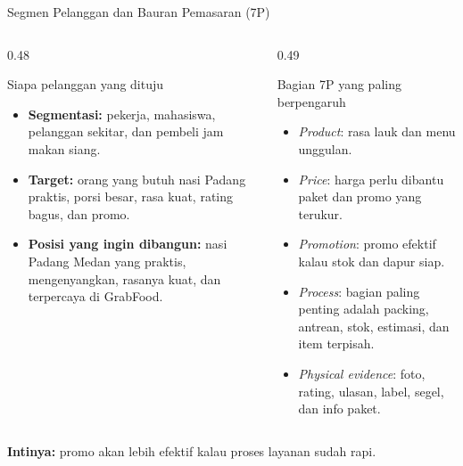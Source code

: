 \documentclass[aspectratio=169,11pt]{beamer}
\newcommand{\strong}[1]{\textbf{\textcolor{usuGreen!85!black}{#1}}}
\begin{document}
\begin{frame}{Segmen Pelanggan dan Bauran Pemasaran (7P)}
\small
\begin{columns}[T,onlytextwidth]
    \begin{column}{0.48\textwidth}
        \begin{block}{Siapa pelanggan yang dituju}
        \begin{itemize}
            \item \strong{Segmentasi:} pekerja, mahasiswa, pelanggan sekitar, dan pembeli jam makan siang.
            \item \strong{Target:} orang yang butuh nasi Padang praktis, porsi besar, rasa kuat, rating bagus, dan promo.
            \item \strong{Posisi yang ingin dibangun:} nasi Padang Medan yang praktis, mengenyangkan, rasanya kuat, dan terpercaya di GrabFood.
        \end{itemize}
        \end{block}
    \end{column}
    \begin{column}{0.49\textwidth}
        \begin{block}{Bagian 7P yang paling berpengaruh}
        \begin{itemize}
            \item \textit{Product}: rasa lauk dan menu unggulan.
            \item \textit{Price}: harga perlu dibantu paket dan promo yang terukur.
            \item \textit{Promotion}: promo efektif kalau stok dan dapur siap.
            \item \textit{Process}: bagian paling penting adalah packing, antrean, stok, estimasi, dan item terpisah.
            \item \textit{Physical evidence}: foto, rating, ulasan, label, segel, dan info paket.
        \end{itemize}
        \end{block}
    \end{column}
\end{columns}
\begin{center}
\strong{Intinya:} promo akan lebih efektif kalau proses layanan sudah rapi.
\end{center}
\end{frame}
\end{document}
